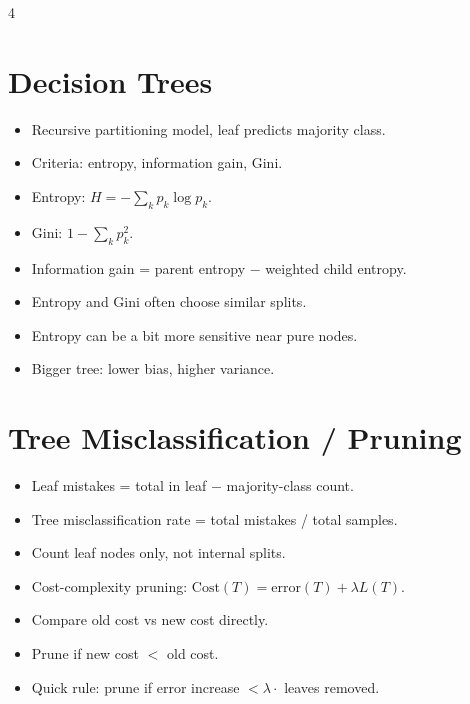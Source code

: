 \documentclass[11pt,landscape]{article}
\begin{document}
\begin{multicols}{4}
		\section{Decision Trees}
		\begin{itemize}
			\item Recursive partitioning model, leaf predicts majority class.
			\item Criteria: entropy, information gain, Gini.
			\item Entropy: $H=-\sum_k p_k\log p_k$.
			\item Gini: $1-\sum_k p_k^2$.
			\item Information gain = parent entropy $-$ weighted child entropy.
			\item Entropy and Gini often choose similar splits.
			\item Entropy can be a bit more sensitive near pure nodes.
			\item Bigger tree: lower bias, higher variance.
		\end{itemize}
		
		\section{Tree Misclassification / Pruning}
		\begin{itemize}
			\item Leaf mistakes = total in leaf $-$ majority-class count.
			\item Tree misclassification rate = total mistakes / total samples.
			\item Count leaf nodes only, not internal splits.
			\item Cost-complexity pruning: $\mathrm{Cost}(T)=\mathrm{error}(T)+\lambda L(T)$.
			\item Compare old cost vs new cost directly.
			\item Prune if new cost $<$ old cost.
			\item Quick rule: prune if error increase $< \lambda \cdot$ leaves removed.
		\end{itemize}
		

\end{multicols}
\end{document}
